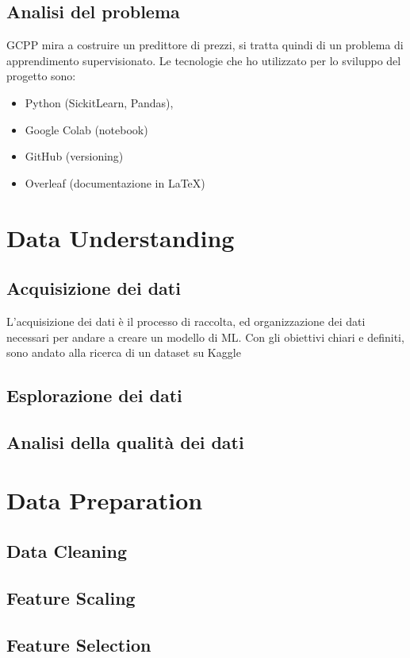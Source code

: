 \documentclass{article}
\begin{document}
    \subsection{Analisi del problema}
    GCPP mira a costruire un predittore di prezzi, si tratta quindi di un problema di apprendimento supervisionato.
    Le tecnologie che ho utilizzato per lo sviluppo del progetto sono:
        \begin{itemize}
        \item Python (SickitLearn, Pandas),
        \item Google Colab (notebook)
        \item GitHub (versioning)
        \item Overleaf (documentazione in \LaTeX)
        \end{itemize}

\newpage
\section{Data Understanding}
    \subsection{Acquisizione dei dati}
    L'acquisizione dei dati è il processo di raccolta, ed organizzazione dei dati necessari per andare a creare un modello di ML. 
    Con gli obiettivi chiari e definiti, sono andato alla ricerca di un dataset su Kaggle
    \subsection{Esplorazione dei dati}
    \subsection{Analisi della qualità dei dati}

\newpage
\section{Data Preparation}
    \subsection{Data Cleaning}
    \subsection{Feature Scaling}
    \subsection{Feature Selection}
\end{document}
